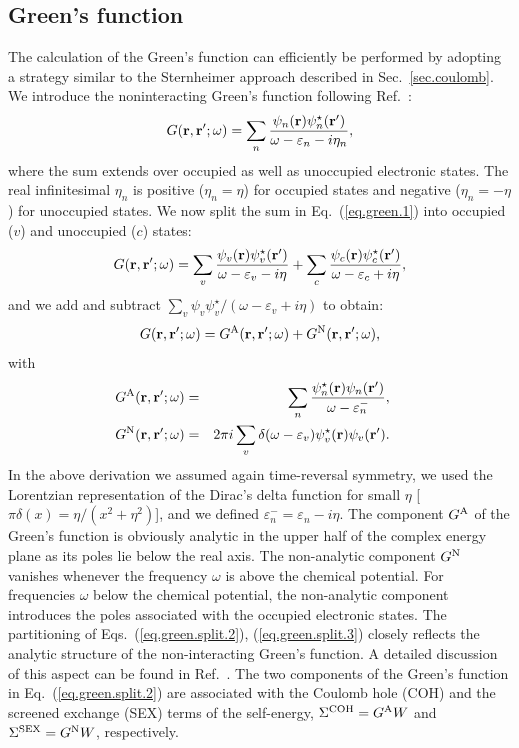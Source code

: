 \documentclass[twocolumn,prb,showpacs,superscriptaddress]{revtex4}
\def\w{\omega}
\def\E{\varepsilon}
\def\r{{\bf r}}
\def\rp{{\bf r^\prime}}
\begin{document}
\subsection{Green's function}\label{sec.green}

The calculation of the Green's function can efficiently be performed 
by adopting a strategy similar to the Sternheimer approach
described in Sec.\ \ref{sec.coulomb}.
We introduce the noninteracting Green's function following Ref.\ :
  \begin{equation}\label{eq.green.1}
  G(\r,\rp;\w) = \sum_n \frac{\psi_n(\r)\psi_n^\star(\rp)}{\w-\E_n-i\eta_n},
  \end{equation}
where the sum extends over occupied as well as unoccupied electronic states.
The real infinitesimal $\eta_n$ is positive ($\eta_n=\eta$) 
for occupied states and negative ($\eta_n=-\eta$) for unoccupied states.\cite{hl,hl86,note.spinfactor}
We now split the sum in Eq.~(\ref{eq.green.1}) into occupied ($v$) and unoccupied ($c$) states:
  \begin{equation}\label{eq.green.2}
  G(\r,\rp;\w) = \sum_v \frac{\psi_v(\r)\psi_v^\star(\rp)}{\w-\E_v-i\eta}
  + \sum_c \frac{\psi_c(\r)\psi_c^\star(\rp)}{\w-\E_c+i\eta},
  \end{equation}
and we add and subtract $\sum_v \psi_v\psi_v^\star/(\w-\E_v+i\eta)$ to obtain:
  \begin{equation}\label{eq.green.split}
  G(\r,\rp;\w) = G^{\rm A}(\r,\rp;\w) + G^{\rm N}(\r,\rp;\w),
  \end{equation}
with
  \begin{eqnarray}\label{eq.green.split.2}
\!\!\!\!\!\!  G^{\rm A}(\r,\rp;\w) & =&  \sum_n \frac{\psi_n^\star(\r)\psi_n(\rp)}{\w-\E_n^-},  \\ 
\!\!\!\!\!\!  G^{\rm N}(\r,\rp;\w)  & = &  2\pi i \sum_v \delta(\w-\E_v) \psi_v^\star(\r)\psi_v(\rp). \label{eq.green.split.3} 
  \end{eqnarray}
In the above derivation we assumed again time-reversal symmetry, we used the Lorentzian representation of the Dirac's delta function 
for small $\eta$ [$\pi\delta(x)=\eta/(x^2+\eta^2)$], and we defined $\E_n^- = \E_n - i\eta$.
The component $G^{\rm A}$ of the Green's function is obviously analytic in the
upper half of the complex energy plane as its poles lie below the real axis.
The non-analytic component $G^{\rm N}$ vanishes
whenever the frequency $\w$ is above the chemical potential. For frequencies $\w$
below the chemical potential, the non-analytic component introduces the poles associated with the occupied 
electronic states. 
The partitioning of Eqs.\ (\ref{eq.green.split.2}),
(\ref{eq.green.split.3}) closely reflects the analytic structure
of the non-interacting Green's function.
A detailed discussion of this aspect can be found in Ref.\ .
The two components of the Green's function in Eq.\ (\ref{eq.green.split.2}) 
are associated with the Coulomb hole (COH) and the screened exchange (SEX) terms of the
self-energy, 
$\Sigma^{\rm COH} = G^{\rm A} W$  and $\Sigma^{\rm SEX} = G^{\rm N} W$,
respectively.\cite{hl86}
\end{document}
